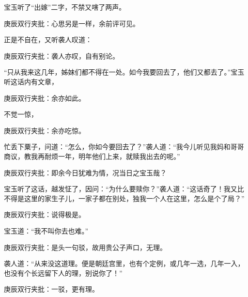 \begin{parag}
    宝玉听了“出嫁”二字，不禁又嗐了两声。\begin{note}庚辰双行夹批：心思另是一样，余前评可见。\end{note}正是不自在，又听袭人叹道：\begin{note}庚辰双行夹批：袭人亦叹，自有别论。\end{note}“只从我来这几年，姊妹们都不得在一处。如今我要回去了，他们又都去了。”宝玉听这话内有文章，\begin{note}庚辰双行夹批：余亦如此。\end{note}不觉一惊，\begin{note}庚辰双行夹批：余亦吃惊。\end{note}忙丢下粟子，问道：“怎么，你如今要回去了？”袭人道：“我今儿听见我妈和哥哥商议，教我再耐烦一年，明年他们上来，就赎我出去的呢。”\begin{note}庚辰双行夹批：即余今日犹难为情，况当日之宝玉哉？\end{note}宝玉听了这话，越发怔了，因问：“为什么要赎你？”袭人道：“这话奇了！我又比不得是这里的家生子儿，一家子都在别处，独我一个人在这里，怎么是个了局？”\begin{note}庚辰双行夹批：说得极是。\end{note}宝玉道：“我不叫你去也难。”\begin{note}庚辰双行夹批：是头一句驳，故用贵公子声口，无理。\end{note}袭人道：“从来没这道理。便是朝廷宫里，也有个定例，或几年一选，几年一入，也没有个长远留下人的理，别说你了！”\begin{note}庚辰双行夹批：一驳，更有理。\end{note}
\end{parag}


